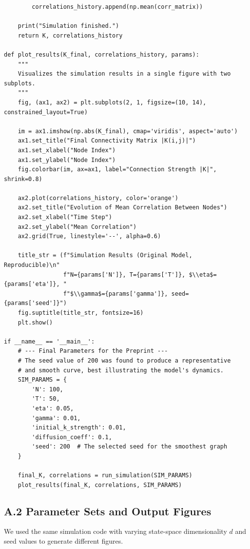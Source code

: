 \documentclass[12pt]{article}
\begin{document}
\begin{verbatim}
        correlations_history.append(np.mean(corr_matrix))
    
    print("Simulation finished.")
    return K, correlations_history

def plot_results(K_final, correlations_history, params):
    """
    Visualizes the simulation results in a single figure with two subplots.
    """
    fig, (ax1, ax2) = plt.subplots(2, 1, figsize=(10, 14), constrained_layout=True)

    im = ax1.imshow(np.abs(K_final), cmap='viridis', aspect='auto')
    ax1.set_title("Final Connectivity Matrix |K(i,j)|")
    ax1.set_xlabel("Node Index")
    ax1.set_ylabel("Node Index")
    fig.colorbar(im, ax=ax1, label="Connection Strength |K|", shrink=0.8)

    ax2.plot(correlations_history, color='orange')
    ax2.set_title("Evolution of Mean Correlation Between Nodes")
    ax2.set_xlabel("Time Step")
    ax2.set_ylabel("Mean Correlation")
    ax2.grid(True, linestyle='--', alpha=0.6)

    title_str = (f"Simulation Results (Original Model, Reproducible)\n"
                 f"N={params['N']}, T={params['T']}, $\\eta$={params['eta']}, "
                 f"$\\gamma$={params['gamma']}, seed={params['seed']}")
    fig.suptitle(title_str, fontsize=16)
    plt.show()

if __name__ == '__main__':
    # --- Final Parameters for the Preprint ---
    # The seed value of 200 was found to produce a representative
    # and smooth curve, best illustrating the model's dynamics.
    SIM_PARAMS = {
        'N': 100,
        'T': 50,
        'eta': 0.05,
        'gamma': 0.01,
        'initial_k_strength': 0.01,
        'diffusion_coeff': 0.1,
        'seed': 200  # The selected seed for the smoothest graph
    }

    final_K, correlations = run_simulation(SIM_PARAMS)
    plot_results(final_K, correlations, SIM_PARAMS)
\end{verbatim}

\vspace{1em}

\subsection*{A.2 Parameter Sets and Output Figures}

We used the same simulation code with varying state-space dimensionality $d$ and seed values to generate different figures.
\end{document}
